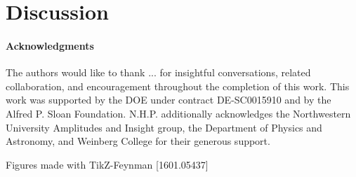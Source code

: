 \documentclass[11pt,letter]{article}
\begin{document}
\section{Discussion}\label{sec:Discussion}
\paragraph{Acknowledgments} The authors would like to thank ... for insightful conversations, related collaboration, and encouragement throughout the completion of this work. This work was supported by the DOE under contract DE-SC0015910 and by the Alfred P. Sloan Foundation. N.H.P. additionally acknowledges the Northwestern University Amplitudes and Insight group, the Department of Physics and Astronomy, and Weinberg College for their generous support. 

Figures made with TikZ-Feynman [1601.05437]

\appendix
\end{document}
